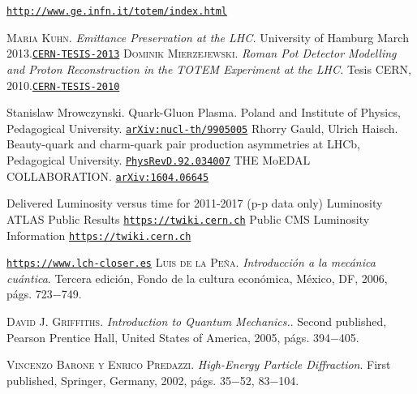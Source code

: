 \begin{thebibliography}{}
 \href{http://www.ge.infn.it/totem/index.html}{\texttt{http://www.ge.infn.it/totem/index.html}} 
  
 
 \textsc{Maria Kuhn.} \textit{Emittance Preservation at the
LHC.}
\textup{University of Hamburg
March 2013.}\href{http://inspirehep.net/record/1296496/files/CERN-THESIS-2013-031.pdf}{\texttt{CERN-TESIS-2013}}
 \textsc{Dominik Mierzejewski.} \textit{Roman Pot Detector Modelling and Proton
Reconstruction in the TOTEM Experiment at the LHC.}
\textup{Tesis CERN, 2010.}\href{https://cds.cern.ch/record/1319606/files/CERN-THESIS-2010-177.pdf}{\texttt{CERN-TESIS-2010}}
 
  Stanislaw Mrowczynski. Quark-Gluon Plasma. Poland and Institute of Physics, Pedagogical University.
 \href{https://arxiv.org/pdf/nucl-th/9905005.pdf}{\texttt{arXiv:nucl-th/9905005}}
  Rhorry Gauld, Ulrich Haisch. Beauty-quark and charm-quark pair production asymmetries at LHCb, Pedagogical University.
 \href{https://journals.aps.org/prd/pdf/10.1103/PhysRevD.92.034007}{\texttt{PhysRevD.92.034007}}
  THE MoEDAL COLLABORATION.
 \href{https://arxiv.org/abs/1604.06645}{\texttt{arXiv:1604.06645}}
 
 
Delivered Luminosity versus time for 2011-2017 (p-p data only) Luminosity ATLAS Public Results 
 \href{https://twiki.cern.ch/twiki/bin/view/AtlasPublic/WebHome}{\texttt{https://twiki.cern.ch}} 
 Public CMS Luminosity Information  
 \href{https://twiki.cern.ch/twiki/bin/view/CMSPublic/LumiPublicResults}{\texttt{https://twiki.cern.ch}}
 
 
 \href{https://www.lch-closer.es}{\texttt{https://www.lch-closer.es}}
 \textsc{Luis de la Pe\~na.} \textit{Introducci\'on a la mec\'anica cu\'antica}.
\textup{Tercera edici\'on, Fondo de la cultura econ\'omica, M\'exico, DF, 2006, p\'ags. 723$-$749.}




 \textsc{David J. Griffiths.} \textit{Introduction to Quantum Mechanics.}.
\textup{Second published, Pearson Prentice Hall, United States of America, 2005, p\'ags. 394$-$405.}

 \textsc{Vincenzo Barone \textup{y} Enrico Predazzi.} \textit{High-Energy Particle Diffraction}.
\textup{First published, Springer, Germany, 2002, p\'ags. 35$-$52, 83$-$104.}


\end{thebibliography}
